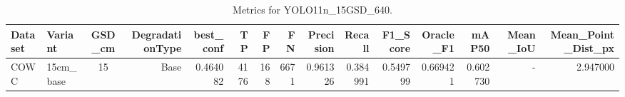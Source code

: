\begin{table}
\caption{Metrics for YOLO11n_15GSD_640.}
\label{tab:rq1_results}
\begin{tabular}{llcrrrrrrrrrrrr}
\toprule
Dataset & Variant & GSD_cm & DegradationType & best_conf & TP & FP & FN & Precision & Recall & F1_Score & Oracle_F1 & mAP50 & Mean_IoU & Mean_Point_Dist_px \\
\midrule
COWC & 15cm_base & 15 & Base & 0.464082 & 4176 & 168 & 6671 & 0.961326 & 0.384991 & 0.549799 & 0.669421 & 0.602730 & - & 2.947000 \\
\bottomrule
\end{tabular}
\end{table}

